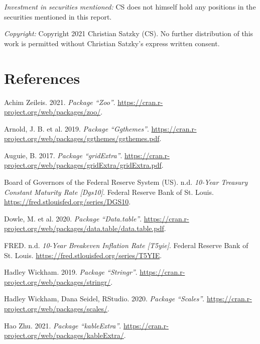 \documentclass[
  12pt,
]{article}
\begin{document}
\emph{Investment in securities mentioned:} CS does not himself hold any
positions in the securities mentioned in this report.

\emph{Copyright:} Copyright 2021 Christian Satzky (CS). No further
distribution of this work is permitted without Christian Satzky's
express written consent.

\newpage

\hypertarget{references}{%
\section*{References}\label{references}}

\hypertarget{refs}{}
\leavevmode\hypertarget{ref-zoo}{}%
Achim Zeileis. 2021. \emph{Package ``Zoo''}.
\url{https://cran.r-project.org/web/packages/zoo/}.

\leavevmode\hypertarget{ref-ggthemes}{}%
Arnold, J. B. et al. 2019. \emph{Package ``Ggthemes''}.
\url{https://cran.r-project.org/web/packages/ggthemes/ggthemes.pdf}.

\leavevmode\hypertarget{ref-gridExtra}{}%
Auguie, B. 2017. \emph{Package ``gridExtra''}.
\url{https://cran.r-project.org/web/packages/gridExtra/gridExtra.pdf}.

\leavevmode\hypertarget{ref-FedInt}{}%
Board of Governors of the Federal Reserve System (US). n.d.
\emph{10-Year Treasury Constant Maturity Rate {[}Dgs10{]}}. Federal
Reserve Bank of St. Louis.
\url{https://fred.stlouisfed.org/series/DGS10}.

\leavevmode\hypertarget{ref-dt}{}%
Dowle, M. et al. 2020. \emph{Package ``Data.table''}.
\url{https://cran.r-project.org/web/packages/data.table/data.table.pdf}.

\leavevmode\hypertarget{ref-FedExpInfl}{}%
FRED. n.d. \emph{10-Year Breakeven Inflation Rate {[}T5yie{]}}. Federal
Reserve Bank of St. Louis.
\url{https://fred.stlouisfed.org/series/T5YIE}.

\leavevmode\hypertarget{ref-stringr}{}%
Hadley Wickham. 2019. \emph{Package ``Stringr''}.
\url{https://cran.r-project.org/web/packages/stringr/}.

\leavevmode\hypertarget{ref-scales}{}%
Hadley Wickham, Dana Seidel, RStudio. 2020. \emph{Package ``Scales''}.
\url{https://cran.r-project.org/web/packages/scales/}.

\leavevmode\hypertarget{ref-kableExtra}{}%
Hao Zhu. 2021. \emph{Package ``kableExtra''}.
\url{https://cran.r-project.org/web/packages/kableExtra/}.
\end{document}

